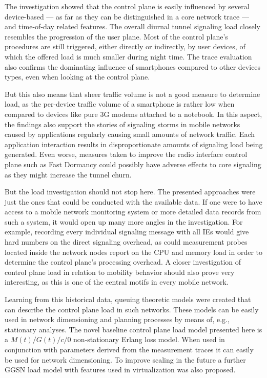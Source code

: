 The investigation showed that the control plane is easily influenced by several device-based --- as far as they can be distinguished in a core network trace --- and time-of-day related features. The overall diurnal tunnel signaling load closely resembles the progression of the user plane. Most of the control plane's procedures are still triggered, either directly or indirectly, by user devices, of which the offered load is much smaller during night time. The trace evaluation also confirms the dominating influence of smartphones compared to other devices types, even when looking at the control plane.

But this also means that sheer traffic volume is not a good measure to determine load, as the per-device traffic volume of a smartphone is rather low when compared to devices like pure \gls{3G} modems attached to a notebook. In this aspect, the findings also support the stories of signaling storms in mobile networks caused by applications regularly causing small amounts of network traffic. Each application interaction results in disproportionate amounts of signaling load being generated. Even worse, measures taken to improve the radio interface control plane such as Fast Dormancy could possibly have adverse effects to core signaling as they might increase the tunnel churn.

But the load investigation should not stop here. The presented approaches were just the ones that could be conducted with the available data. If one were to have access to a mobile network monitoring system or more detailed data records from such a system, it would open up many more angles in the investigation. For example, recording every individual signaling message with all \glspl{IE} would give hard numbers on the direct signaling overhead, as could measurement probes located inside the network nodes report on the CPU and memory load in order to determine the control plane's processing overhead. A closer investigation of control plane load in relation to mobility behavior should also prove very interesting, as this is one of the central motifs in every mobile network.

Learning from this historical data, queuing theoretic models were created that can describe the control plane load in such networks. These models can be easily used in network dimensioning and planning processes by means of, e.g., stationary analyses. The novel baseline control plane load model presented here is a $M(t)/G(t)/c/0$ non-stationary Erlang loss model. When used in conjunction with parameters derived from the measurement traces it can easily be used for network dimensioning. To improve scaling in the future a further \gls{GGSN} load model with features used in virtualization was also proposed.


